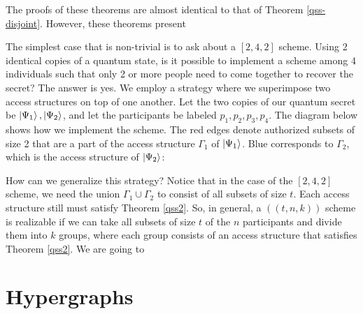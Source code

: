 The proofs of these theorems are almost identical to that of Theorem \ref{qss-disjoint}. However, these theorems present 

The simplest case that is non-trivial is to ask about a $[2,4,2]$ scheme. Using 2 identical copies of a quantum state, is it possible to implement a scheme among 4 individuals such that only 2 or more people need to come together to recover the secret? The answer is yes. We employ a strategy where we superimpose two access structures on top of one another. Let the two copies of our quantum secret be $\ket{\Psi_1}, \ket{\Psi_2}$, and let the participants be labeled $p_1, p_2, p_3, p_4$. The diagram below shows how we implement the scheme. The red edges denote authorized subsets of size 2 that are a part of the access structure $\Gamma_1$ of $\ket{\Psi_1}$. Blue corresponds to $\Gamma_2$, which is the access structure of $\ket{\Psi_2}$:


How can we generalize this strategy? Notice that in the case of the $[2,4,2]$ scheme, we need the union $\Gamma_1 \cup \Gamma_2$ to consist of all subsets of size $t$. Each access structure still must satisfy Theorem \ref{qss2}. So, in general, a $((t,n,k))$ scheme is realizable if we can take all subsets of size $t$ of the $n$ participants and divide them into $k$ groups, where each group consists of an access structure that satisfies Theorem \ref{qss2}. We are going to 

\section{Hypergraphs}


